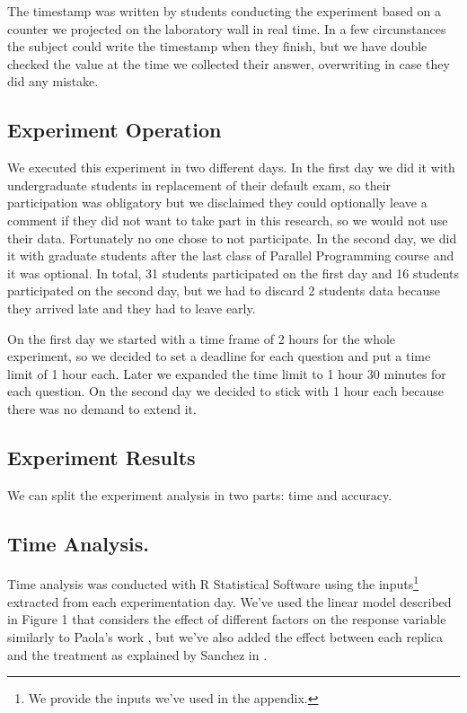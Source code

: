 The timestamp was written by students conducting the experiment based on a counter we projected on the laboratory wall in real time. In a few circunstances the subject could write the timestamp when they finish, but we have double checked the value at the time we collected their answer, overwriting in case they did any mistake.

\subsection{Experiment Operation}

We executed this experiment in two different days. In the first day we did it with undergraduate students in replacement of their default exam, so their participation was obligatory but we disclaimed they could optionally leave a comment if they did not want to take part in this research, so we would not use their data. Fortunately no one chose to not participate. In the second day, we did it with graduate students after the last class of Parallel Programming course and it was optional. In total, 31 students participated on the first day and 16 students participated on the second day, but we had to discard 2 students data because they arrived late and they had to leave early.

On the first day we started with a time frame of 2 hours for the whole experiment, so we decided to set a deadline for each question and put a time limit of 1 hour each. Later we expanded the time limit to 1 hour 30 minutes for each question. On the second day we decided to stick with 1 hour each because there was no demand to extend it.

\subsection{Experiment Results}

We can split the experiment analysis in two parts: time and accuracy.

\subsection{Time Analysis.}

Time analysis was conducted with R Statistical Software using the inputs\footnote{We provide the inputs we've used in the appendix.} extracted from each experimentation day. We've used the linear model described in Figure 1 that considers the effect of different factors on the response variable similarly to Paola's work \cite{paola}, but we've also added the effect between each replica and the treatment as explained by Sanchez in \cite{sanchez}.

